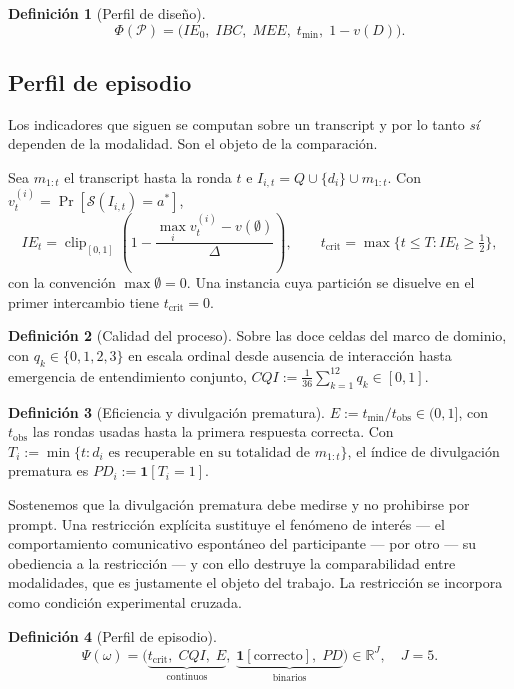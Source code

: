 \documentclass[11pt,a4paper]{article}
\theoremstyle{definition}
\newtheorem{definicion}{Definición}[section]
\theoremstyle{plain}
\theoremstyle{remark}
\DeclareMathOperator{\clip}{clip}
\newcommand{\ind}[1]{\mathbf{1}\!\left[#1\right]}
\newcommand{\solver}{\mathcal{S}}
\newcommand{\Real}{\mathbb{R}}
\begin{document}
\begin{definicion}[Perfil de diseño]\label{def:phi}
\[
  \Phi(\mathcal{P})=\big(IE_0,\;IBC,\;MEE,\;t_{\min},\;1-v(D)\big).
\]
\end{definicion}

\subsection{Perfil de episodio}

Los indicadores que siguen se computan sobre un transcript y por lo tanto
\emph{sí} dependen de la modalidad. Son el objeto de la comparación.

Sea $m_{1:t}$ el transcript hasta la ronda $t$ e $I_{i,t}=Q\cup\{d_i\}\cup m_{1:t}$.
Con $v^{(i)}_t=\Pr[\solver(I_{i,t})=a^\ast]$,
\[
  IE_t=\clip_{[0,1]}\!\left(1-\frac{\max_i v^{(i)}_t-v(\emptyset)}{\Delta}\right),
  \qquad
  t_{\mathrm{crit}}=\max\{t\le T: IE_t\ge \tfrac12\},
\]
con la convención $\max\emptyset=0$. Una instancia cuya partición se disuelve en el
primer intercambio tiene $t_{\mathrm{crit}}=0$.

\begin{definicion}[Calidad del proceso]
Sobre las doce celdas del marco de dominio, con $q_k\in\{0,1,2,3\}$ en escala
ordinal desde ausencia de interacción hasta emergencia de entendimiento conjunto,
$CQI:=\tfrac1{36}\sum_{k=1}^{12}q_k\in[0,1]$.
\end{definicion}

\begin{definicion}[Eficiencia y divulgación prematura]
$E:=t_{\min}/t_{\mathrm{obs}}\in(0,1]$, con $t_{\mathrm{obs}}$ las rondas usadas
hasta la primera respuesta correcta. Con
$T_i:=\min\{t: d_i \text{ es recuperable en su totalidad de } m_{1:t}\}$, el
índice de divulgación prematura es $PD_i:=\ind{T_i=1}$.
\end{definicion}

Sostenemos que la divulgación prematura debe medirse y no prohibirse por prompt.
Una restricción explícita sustituye el fenómeno de interés --- el comportamiento
comunicativo espontáneo del participante --- por otro --- su obediencia a la
restricción --- y con ello destruye la comparabilidad entre modalidades, que es
justamente el objeto del trabajo. La restricción se incorpora como condición
experimental cruzada.

\begin{definicion}[Perfil de episodio]\label{def:psi}
\[
  \Psi(\omega)=\big(\underbrace{t_{\mathrm{crit}},\;CQI,\;E}_{\text{continuos}},\;
  \underbrace{\ind{\text{correcto}},\;PD}_{\text{binarios}}\big)\in\Real^{J},\quad J=5.
\]
\end{definicion}
\end{document}
